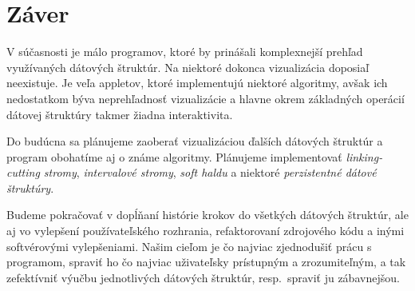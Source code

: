 \section{Záver}

V súčasnosti je málo programov, ktoré by prinášali komplexnejší prehľad 
využívaných dátových štruktúr. Na niektoré dokonca vizualizácia doposiaľ 
neexistuje. Je veľa appletov, ktoré implementujú niektoré algoritmy, avšak 
ich nedostatkom býva neprehľadnosť vizualizácie a hlavne okrem základných 
operácií dátovej štruktúry takmer žiadna interaktivita. 

Do budúcna sa plánujeme zaoberať vizualizáciou ďalších dátových 
štruktúr a program obohatíme aj o známe algoritmy. Plánujeme implementovať 
\emph{linking-cutting stromy}, \emph{intervalové stromy}, \emph{soft haldu} 
a niektoré \emph{perzistentné dátové štruktúry}.

Budeme pokračovať v dopĺňaní histórie krokov do všetkých dátových štruktúr, 
ale aj vo vylepšení používateľského rozhrania, refaktorovaní zdrojového kódu 
a inými softvérovými vylepšeniami. Našim cieľom je čo najviac zjednodušiť 
prácu s programom, spraviť ho čo najviac uživateľsky prístupným a 
zrozumiteľným, a tak zefektívniť výučbu jednotlivých dátových štruktúr, 
resp.\ spraviť ju zábavnejšou.
